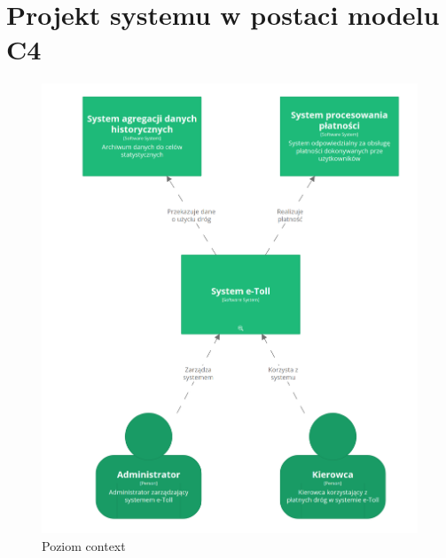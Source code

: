 \documentclass[12pt]{article}
\begin{document}
\section{Projekt systemu w postaci modelu C4}
    \begin{figure}[H]
    \centering
    \includegraphics[width=1\textwidth]{c4/etoll.png}
    \caption{Poziom context}
    \label{fig:deployment-tech}
    \end{figure}
\end{document}
